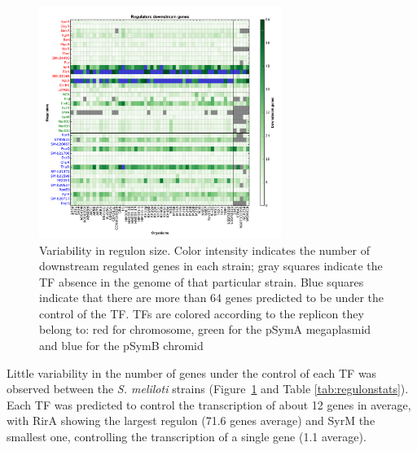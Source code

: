 \begin{figure}[!tb]
	\centering
	\includegraphics[width=0.7\textwidth]{./figures/Appendix_1/2_reg}
  	\caption{\label{fig:reg2} Variability in regulon size. Color intensity indicates the number of downstream regulated genes in each strain; gray squares indicate the TF absence in the genome of that particular strain. Blue squares indicate that there are more than 64 genes predicted to be under the control of the TF. TFs are colored according to the replicon they belong to: red for chromosome, green for the pSymA megaplasmid and blue for the pSymB chromid}
\end{figure}
Little variability in the number of genes under the control of each TF was observed between the \textit{S. meliloti} strains (Figure~\ref{fig:reg2} and Table \ref{tab:regulonstats}).\\
Each TF was predicted to control the transcription of about 12 genes in average, with RirA showing the largest regulon (71.6 genes average) and SyrM the smallest one, controlling the transcription of a single gene (1.1 average).\\
